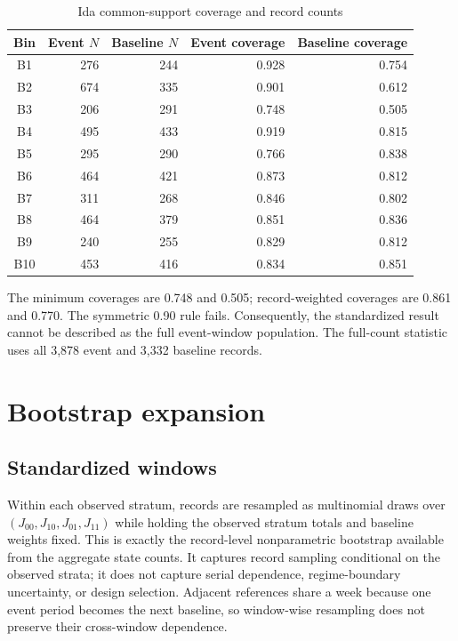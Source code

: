 \documentclass[11pt]{article}
\begin{document}
\begin{table}[t]
\centering
\caption{Ida common-support coverage and record counts}
\label{tab:coverage}
\begin{tabular}{@{}crrrr@{}}
\toprule
Bin & Event $N$ & Baseline $N$ & Event coverage & Baseline coverage \\
\midrule
B1 & 276 & 244 & 0.928 & 0.754 \\
B2 & 674 & 335 & 0.901 & 0.612 \\
B3 & 206 & 291 & 0.748 & 0.505 \\
B4 & 495 & 433 & 0.919 & 0.815 \\
B5 & 295 & 290 & 0.766 & 0.838 \\
B6 & 464 & 421 & 0.873 & 0.812 \\
B7 & 311 & 268 & 0.846 & 0.802 \\
B8 & 464 & 379 & 0.851 & 0.836 \\
B9 & 240 & 255 & 0.829 & 0.812 \\
B10 & 453 & 416 & 0.834 & 0.851 \\
\bottomrule
\end{tabular}
\end{table}

The minimum coverages are 0.748 and 0.505; record-weighted coverages are 0.861 and 0.770. The symmetric 0.90 rule fails. Consequently, the standardized result cannot be described as the full event-window population. The full-count statistic uses all 3,878 event and 3,332 baseline records.

\section{Bootstrap expansion}

\subsection{Standardized windows}

Within each observed stratum, records are resampled as multinomial draws over $(J_{00},J_{10},J_{01},J_{11})$ while holding the observed stratum totals and baseline weights fixed. This is exactly the record-level nonparametric bootstrap available from the aggregate state counts. It captures record sampling conditional on the observed strata; it does not capture serial dependence, regime-boundary uncertainty, or design selection. Adjacent references share a week because one event period becomes the next baseline, so window-wise resampling does not preserve their cross-window dependence.
\end{document}
